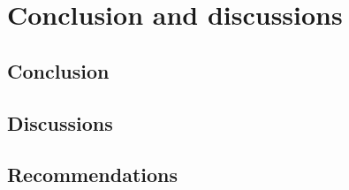\chapter{Conclusion and discussions}
\label{ch:conclusionanddiscussions}

\lipsum[1]

\section{Conclusion}
\label{sec:conclusion}

\lipsum[1]

\section{Discussions}
\label{sec:discussions}

\lipsum[1]

\section{Recommendations}
\label{sec:reccomandations}

\lipsum[1]
